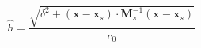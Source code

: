 $$
\hat h = \frac{\sqrt{\delta^{2} + (\mathbf x-\mathbf x_s)\cdot\mathbf M_s^{-1}(\mathbf x-\mathbf x_s)}}{c_0}
$$
